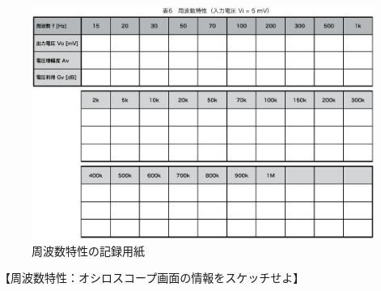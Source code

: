 \documentclass[uplatex,a4paper,11pt,oneside,openany]{jsbook}
\begin{document}
\newpage

\begin{figure}[H]
  \centering
   \includegraphics[keepaspectratio, scale=0.76, angle=90]
               {figs/eps/kiroku.eps}
               \caption{周波数特性の記録用紙}
               \label{fig:22_2}
\end{figure}

\newpage

【周波数特性：オシロスコープ画面の情報をスケッチせよ】
\end{document}
